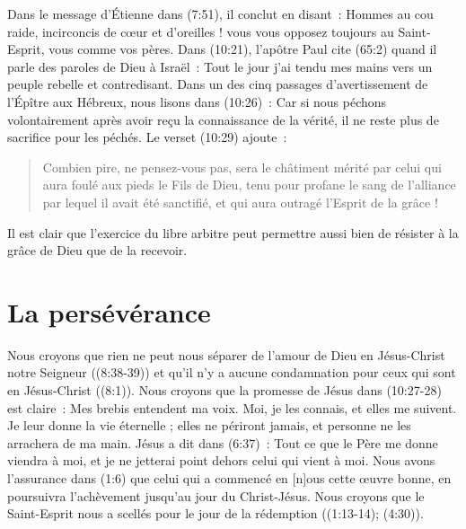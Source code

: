 \begin{digestpar}{}
Dans le message d'Étienne dans
 (7:51), il conclut en disant~:
 \og Hommes au cou raide, incirconcis de cœur et d'oreilles !
 vous vous opposez toujours au Saint-Esprit, vous comme vos pères. \fg{}
 Dans (10:21),
 l'apôtre Paul cite (65:2)
 quand il parle des paroles de Dieu à Israël~:
 \og Tout le jour j'ai tendu mes mains vers un peuple rebelle et contredisant. \fg{}
 Dans un des cinq passages d'avertissement de l'Épître aux Hébreux,
 nous lisons dans (10:26)~:
 \og Car si nous péchons volontairement après avoir reçu la connaissance de la vérité,
 il ne reste plus de sacrifice pour les péchés. \fg{}
 Le verset (10:29) ajoute~:
\end{digestpar}

\begin{quote}
\begin{digestpar}{}
 \og Combien pire, ne pensez-vous pas, sera le châtiment mérité par celui qui
 aura foulé aux pieds le Fils de Dieu, tenu pour profane le sang de l'alliance
 par lequel il avait été sanctifié, et qui aura outragé l'Esprit de la grâce ! \fg{}
\end{digestpar}
\end{quote}

Il est clair que l'exercice du libre arbitre peut permettre aussi bien de résister
 à la grâce de Dieu que de la recevoir.

\section*{La persévérance}

\begin{digestpar}{}
Nous croyons que rien ne peut nous séparer de l'amour de Dieu en Jésus-Christ notre Seigneur
 ((8:38-39))
 et qu'il n'y a aucune condamnation pour ceux qui sont en Jésus-Christ
 ((8:1)).
 Nous croyons que la promesse de Jésus dans (10:27-28) est claire~:
 \og Mes brebis entendent ma voix. Moi, je les connais, et elles me suivent.
 Je leur donne la vie éternelle ; elles ne périront jamais,
 et personne ne les arrachera de ma main. \fg{}
 Jésus a dit dans (6:37)~:
 \og Tout ce que le Père me donne viendra à moi,
 et je ne jetterai point dehors celui qui vient à moi. \fg{}
 Nous avons l'assurance dans (1:6) \og que celui qui a commencé
 en [n]ous cette œuvre bonne, en poursuivra l'achèvement jusqu'au jour
 du Christ-Jésus. \fg{}
 Nous croyons que le Saint-Esprit nous a scellés
 pour le jour de la rédemption ((1:13-14);
 (4:30)).
\end{digestpar}

